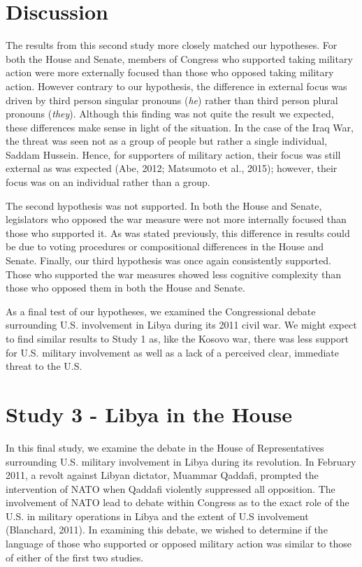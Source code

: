 \documentclass[english,,man,floatsintext]{apa6}
\begin{document}
\hypertarget{discussion-1}{%
\section{Discussion}\label{discussion-1}}

The results from this second study more closely matched our hypotheses. For both the House and Senate, members of Congress who supported taking military action were more externally focused than those who opposed taking military action. However contrary to our hypothesis, the difference in external focus was driven by third person singular pronouns (\emph{he}) rather than third person plural pronouns (\emph{they}). Although this finding was not quite the result we expected, these differences make sense in light of the situation. In the case of the Iraq War, the threat was seen not as a group of people but rather a single individual, Saddam Hussein. Hence, for supporters of military action, their focus was still external as was expected (Abe, 2012; Matsumoto et al., 2015); however, their focus was on an individual rather than a group.

The second hypothesis was not supported. In both the House and Senate, legislators who opposed the war measure were not more internally focused than those who supported it. As was stated previously, this difference in results could be due to voting procedures or compositional differences in the House and Senate. Finally, our third hypothesis was once again consistently supported. Those who supported the war measures showed less cognitive complexity than those who opposed them in both the House and Senate.

As a final test of our hypotheses, we examined the Congressional debate surrounding U.S. involvement in Libya during its 2011 civil war. We might expect to find similar results to Study 1 as, like the Kosovo war, there was less support for U.S. military involvement as well as a lack of a perceived clear, immediate threat to the U.S.

\hypertarget{study-3---libya-in-the-house}{%
\section{Study 3 - Libya in the House}\label{study-3---libya-in-the-house}}

In this final study, we examine the debate in the House of Representatives surrounding U.S. military involvement in Libya during its revolution. In February 2011, a revolt against Libyan dictator, Muammar Qaddafi, prompted the intervention of NATO when Qaddafi violently suppressed all opposition. The involvement of NATO lead to debate within Congress as to the exact role of the U.S. in military operations in Libya and the extent of U.S involvement (Blanchard, 2011). In examining this debate, we wished to determine if the language of those who supported or opposed military action was similar to those of either of the first two studies.
\end{document}
